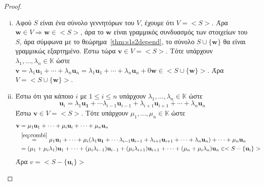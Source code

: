 \begin{proof}
\item {}
    \begin{enumerate}[i)]
        \item Αφού $S$ είναι ένα σύνολο γεννητόρων του $V$, έχουμε ότι 
            $ V = < S >  $.
            Άρα $ \mathbf{w} \in V \Rightarrow \mathbf{w} \in < S >  $, άρα το 
            $ \mathbf{w} $ είναι γραμμικός συνδυασμός των στοιχείων του $S$, 
            άρα σύμφωνα με το θεώρημα~\ref{thm:s1s2depend}, το σύνολο 
            $ S \cup \{ \mathbf{w} \} $ θα είναι γραμμικώς εξαρτημένο.
            Έστω τώρα  $ \mathbf{v} \in V = < S >  $. Τότε υπάρχουν 
            $ \lambda _{1}, \ldots, \lambda _{n} \in \mathbb{K} $ ώστε 
            $ \mathbf{v} = \lambda _{1} \mathbf{u}_{1}+ \cdots + \lambda _{n} 
            \mathbf{u}_{n} = \lambda _{1} \mathbf{u}_{1}+ \cdots + \lambda _{n} 
            \mathbf{u}_{n} + 0 \mathbf{w} \in < S  \cup \{ \mathbf{w}  \} > $. Άρα 
            $ V = < S \cup \{ \mathbf{w} \} >  $.
        \item Έστω ότι για κάποιο $ i $ με $ 1 \leq i \leq n $ υπάρχουν 
            $ \lambda _{1}, \ldots, \lambda _{n} \in \mathbb{K} $ ώστε 
            \begin{equation*}
                \label{eq:combi}
                \mathbf{u}_{i} = \lambda _{1} \mathbf{u_{1}} + \cdots \lambda _{i-1}
                \mathbf{u}_{i-1} + \lambda _{i+1} \mathbf{u}_{i+1} + \cdots + 
                \lambda _{n} \mathbf{u}_{n} 
            \end{equation*}
            Έστω $ \mathbf{v} \in V = < S > $. Τότε υπάρχουν $ \mu _{1}, \ldots, 
            \mu _{n} \in \mathbb{K} $ ώστε 
            \begin{align*} 
                \mathbf{v} &= 
                \mu _{1} \mathbf{u}_{1} + \cdots + \mu _{i} \mathbf{u}_{i} + \cdots + 
                \mu _{n} \mathbf{u}_{n} \\ 
                           &\overset{\ref{eq:combi}}{=} 
                           \mu _{1} \mathbf{u}_{1} + \cdots + \mu _{i} (\lambda _{1} 
                           \mathbf{u_{1}} + \cdots \lambda _{i-1}
                           \mathbf{u}_{i-1} + \lambda _{i+1} \mathbf{u}_{i+1} + 
                           \cdots + \lambda _{n} \mathbf{u}_{n}) + \cdots + \mu _{n} 
                           \mathbf{u}_{n} \\
                           &=(\mu _{1}+ \mu _{i}\lambda_{1}) \mathbf{u}_{1} + \cdots + 
                           (\mu _{i} \lambda _{i-1}) \mathbf{u}_{i-1} + (\mu _{i} 
                           \lambda _{i+1}) \mathbf{u}_{i+1} + \cdots + (\mu _{n} + 
                           \mu _{i} \lambda _{n}) \mathbf{u}_{n} \in 
                           < S - \{ \mathbf{u}_{i} \} >  
            \end{align*}
            Άρα $ v = < S - \{ \mathbf{u}_{i} \} >  $
    \end{enumerate}
\end{proof}

